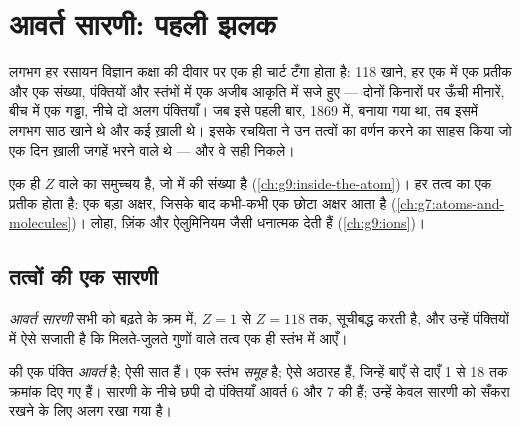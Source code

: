 \chapter{आवर्त सारणी: पहली झलक}\label{ch:g9:periodic-table-first-look}

लगभग हर रसायन विज्ञान कक्षा की दीवार पर एक ही चार्ट टँगा होता है: 118 खाने,
हर एक में एक प्रतीक और एक संख्या, पंक्तियों और स्तंभों में एक अजीब आकृति में
सजे हुए --- दोनों किनारों पर ऊँची मीनारें, बीच में एक गड्ढा, नीचे दो अलग
पंक्तियाँ। जब इसे पहली बार, 1869 में, बनाया गया था, तब इसमें लगभग साठ खाने थे
और कई ख़ाली थे। इसके रचयिता ने उन तत्वों का वर्णन करने का साहस किया जो एक
दिन ख़ाली जगहें भरने वाले थे --- और वे
सही निकले।

\begin{recall}
 एक ही  $Z$ वाले  का समुच्चय है, जो
 में  की संख्या है (\cref{ch:g9:inside-the-atom})।
हर तत्व का एक प्रतीक होता है: एक बड़ा अक्षर, जिसके बाद कभी-कभी एक छोटा
अक्षर आता है (\cref{ch:g7:atoms-and-molecules})। लोहा, ज़िंक और ऐलुमिनियम
जैसी  धनात्मक  देती हैं (\cref{ch:g9:ions})।
\end{recall}

\section{तत्वों की एक सारणी}

\begin{definition}[आवर्त सारणी]\label{def:g9:periodic-table-first-look:periodic-table}
\emph{आवर्त सारणी} सभी  को बढ़ते
 के क्रम में, $Z = 1$ से $Z = 118$ तक, सूचीबद्ध करती है,
और उन्हें पंक्तियों में ऐसे सजाती है कि मिलते-जुलते गुणों वाले तत्व एक ही
स्तंभ में आएँ।
\end{definition}

\begin{definition}[आवर्त और समूह]\label{def:g9:periodic-table-first-look:period}
 की एक पंक्ति \emph{आवर्त} है; ऐसी सात
हैं। एक स्तंभ \emph{समूह} है; ऐसे अठारह हैं, जिन्हें बाएँ से
दाएँ 1 से 18 तक क्रमांक दिए गए हैं। सारणी के नीचे छपी दो पंक्तियाँ आवर्त 6
और 7 की हैं; उन्हें केवल सारणी को सँकरा रखने के लिए
अलग रखा गया है।
\end{definition}

